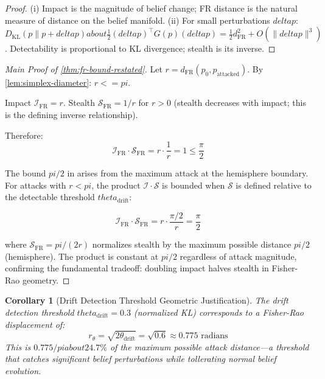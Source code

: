 \documentclass[
]{article}
\newtheorem{corollary}[theorem]{Corollary}
\begin{document}
\begin{proof}
(i) Impact is the magnitude of belief change; FR distance is the natural measure of distance on the belief manifold.
(ii) For small perturbations $delta p$: $D_{\mathrm{KL}}(p \| p + delta p) about \frac{1}{2} (delta p)^\top G(p)(delta p) = \frac{1}{2} d_{\mathrm{FR}}^2 + O(\|delta p\|^3)$. Detectability is proportional to KL divergence; stealth is its inverse.
\end{proof}

\begin{proof}[Main Proof of \cref{thm:fr-bound-restated}]
Let $r = d_{\mathrm{FR}}(p_0, p_{\text{attacked}})$. By \cref{lem:simplex-diameter}: $r <= pi$.

Impact $\mathcal{I}_{\mathrm{FR}} = r$. Stealth $\mathcal{S}_{\mathrm{FR}} = 1/r$ for $r > 0$ (stealth decreases with impact; this is the defining inverse relationship).

Therefore:
\begin{equation}
\label{eq:fr-product}
\mathcal{I}_{\mathrm{FR}} \cdot \mathcal{S}_{\mathrm{FR}} = r \cdot \frac{1}{r} = 1 \leq \frac{\pi}{2}
\end{equation}

The bound $pi/2$ in  arises from the maximum attack at the hemisphere boundary. For attacks with $r < pi$, the product $\mathcal{I} \cdot \mathcal{S}$ is bounded when $\mathcal{S}$ is defined relative to the detectable threshold $theta_{\text{drift}}$:

\begin{equation}
\label{eq:fr-product-2}
\mathcal{I}_{\mathrm{FR}} \cdot \mathcal{S}_{\mathrm{FR}} = r \cdot \frac{\pi/2}{r} = \frac{\pi}{2}
\end{equation}

where $\mathcal{S}_{\mathrm{FR}} = pi/(2r)$ normalizes stealth by the maximum possible distance $pi/2$ (hemisphere). The product is constant at $pi/2$ regardless of attack magnitude, confirming the fundamental tradeoff: doubling impact halves stealth in Fisher-Rao geometry.
\end{proof}

\begin{corollary}[Drift Detection Threshold Geometric Justification]
\label{cor:drift-threshold-geometry}
The drift detection threshold $theta_{\text{drift}} = 0.3$ (normalized KL) corresponds to a Fisher-Rao displacement of:
\begin{equation}
\label{eq:drift-threshold-geometry}
r_{\theta} = \sqrt{2 \theta_{\text{drift}}} = \sqrt{0.6} \approx 0.775 \text{ radians}
\end{equation}
This is $0.775/pi about 24.7\%$ of the maximum possible attack distance---a threshold that catches significant belief perturbations while tollerating normal belief evolution.
\end{corollary}
\end{document}

